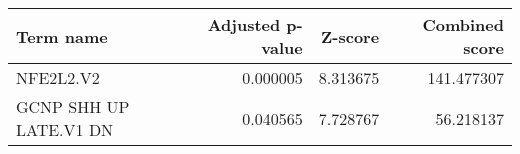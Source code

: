 \begin{tabular}{lrrr}
\toprule
             Term name &  Adjusted p-value &  Z-score &  Combined score \\
\midrule
             NFE2L2.V2 &          0.000005 & 8.313675 &      141.477307 \\
GCNP SHH UP LATE.V1 DN &          0.040565 & 7.728767 &       56.218137 \\
\bottomrule
\end{tabular}
